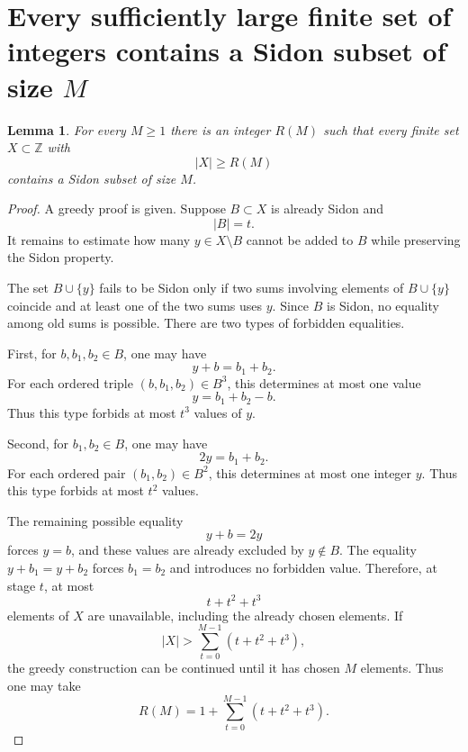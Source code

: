 \documentclass[11pt]{article}
\numberwithin{equation}{section}
\newtheorem{lemma}[theorem]{Lemma}
\newcommand{\Z}{\mathbb Z}
\newcommand{\1}{\mathbf 1}
\begin{document}
\section{Every sufficiently large finite set of integers contains a Sidon subset of size \texorpdfstring{\(M\)}{M}}
\label{app:sidon-subsets}

\begin{lemma}
\label{lem:large-set-sidon-subset}
For every \(M\ge1\) there is an integer \(R(M)\) such that every finite
set \(X\subset\Z\) with
\[
        |X|\ge R(M)
\]
contains a Sidon subset of size \(M\).
\end{lemma}

\begin{proof}
A greedy proof is given.  Suppose \(B\subset X\) is already Sidon and
\[
        |B|=t.
\]
It remains to estimate how many \(y\in X\setminus B\) cannot be added to \(B\) while
preserving the Sidon property.

The set \(B\cup\{y\}\) fails to be Sidon only if two sums involving
elements of \(B\cup\{y\}\) coincide and at least one of the two sums uses
\(y\).  Since \(B\) is Sidon, no equality among old sums is possible.
There are two types of forbidden equalities.

First, for \(b,b_1,b_2\in B\), one may have
\[
        y+b=b_1+b_2.
\]
For each ordered triple \((b,b_1,b_2)\in B^3\), this determines at most
one value
\[
        y=b_1+b_2-b.
\]
Thus this type forbids at most \(t^3\) values of \(y\).

Second, for \(b_1,b_2\in B\), one may have
\[
        2y=b_1+b_2.
\]
For each ordered pair \((b_1,b_2)\in B^2\), this determines at most one
integer \(y\).  Thus this type forbids at most \(t^2\) values.

The remaining possible equality
\[
        y+b=2y
\]
forces \(y=b\), and these values are already excluded by \(y\notin B\).
The equality \(y+b_1=y+b_2\) forces \(b_1=b_2\) and introduces no forbidden value.
Therefore, at stage \(t\), at most
\[
        t+t^2+t^3
\]
elements of \(X\) are unavailable, including the already chosen elements.
If
\[
        |X|>\sum_{t=0}^{M-1}(t+t^2+t^3),
\]
the greedy construction can be continued until it has chosen \(M\)
elements.  Thus one may take
\[
        R(M)=1+\sum_{t=0}^{M-1}(t+t^2+t^3).
\]
\end{proof}
\end{document}
